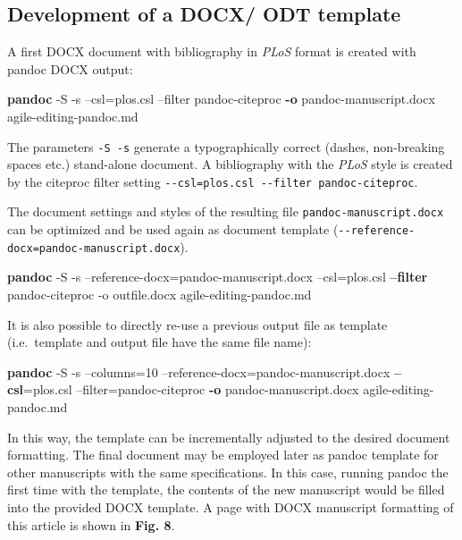 \documentclass[10pt,fleqn]{wlpeerj}
\newenvironment{Shaded}{}{}
\newcommand{\KeywordTok}[1]{\textcolor[rgb]{0.00,0.44,0.13}{\textbf{{#1}}}}
\newcommand{\NormalTok}[1]{{#1}}
\begin{document}
\subsection{Development of a DOCX/ ODT
template}\label{development-of-a-docx-odt-template}

A first DOCX document with bibliography in \emph{PLoS} format is created
with pandoc DOCX output:

\begin{Shaded}
\begin{Highlighting}[]
\KeywordTok{pandoc} \NormalTok{-S -s --csl=plos.csl --filter pandoc-citeproc}
  \KeywordTok{-o} \NormalTok{pandoc-manuscript.docx agile-editing-pandoc.md}
\end{Highlighting}
\end{Shaded}

The parameters \texttt{-S\ -s} generate a typographically correct
(dashes, non-breaking spaces etc.) stand-alone document. A bibliography
with the \emph{PLoS} style is created by the citeproc filter setting
\texttt{-\/-csl=plos.csl\ -\/-filter\ pandoc-citeproc}.

The document settings and styles of the resulting file
\texttt{pandoc-manuscript.docx} can be optimized and be used again as
document template (\texttt{-\/-reference-docx=pandoc-manuscript.docx}).

\begin{Shaded}
\begin{Highlighting}[]
\KeywordTok{pandoc} \NormalTok{-S -s --reference-docx=pandoc-manuscript.docx --csl=plos.csl}
  \KeywordTok{--filter} \NormalTok{pandoc-citeproc -o outfile.docx agile-editing-pandoc.md}
\end{Highlighting}
\end{Shaded}

It is also possible to directly re-use a previous output file as
template (i.e.~template and output file have the same file name):

\begin{Shaded}
\begin{Highlighting}[]
\KeywordTok{pandoc} \NormalTok{-S -s --columns=10 --reference-docx=pandoc-manuscript.docx}
  \KeywordTok{--csl}\NormalTok{=plos.csl --filter=pandoc-citeproc}
  \KeywordTok{-o} \NormalTok{pandoc-manuscript.docx agile-editing-pandoc.md}
\end{Highlighting}
\end{Shaded}

In this way, the template can be incrementally adjusted to the desired
document formatting. The final document may be employed later as pandoc
template for other manuscripts with the same specifications. In this
case, running pandoc the first time with the template, the contents of
the new manuscript would be filled into the provided DOCX template. A
page with DOCX manuscript formatting of this article is shown in
\textbf{Fig. 8}.
\end{document}
